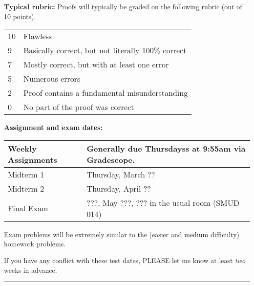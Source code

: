 \documentclass[12pt]{article}
\begin{document}
\vspace*{.15in}
\noindent\begin{minipage}{\textwidth}
\noindent\textbf{Typical rubric:}
Proofs will typically be graded on the following rubric (out of 10 points).

  \begin{center}
   \begin{tabular}{|l|l|}
   \hline
   10& Flawless\\
   9& Basically correct, but not literally 100\% correct\\
   7& Mostly correct, but with at least one error\\
   5& Numerous errors\\
   2& Proof contains a fundamental misunderstanding\\
   0& No part of the proof was correct\\
   \hline
   \end{tabular}
  \end{center}
\end{minipage}

\noindent\textbf{Assignment and exam dates:}

\begin{center}
 \begin{tabular}{|l|l|}
 \hline
 Weekly Assignments & Generally due Thursdayss at 9:55am via Gradescope.\\
 \hline
 Midterm 1 & Thursday, March ?? \\
 Midterm 2 & Thursday, April ?? \\ 
   Final Exam & ???, May ???, ??? in the usual room (SMUD 014)	 \\
 \hline
 \end{tabular}
\end{center}

\noindent Exam problems will be extremely similar to the (easier and medium difficulty) homework problems.
\smallskip

\noindent If you have any conflict with these test dates, PLEASE let me know at least \emph{two} weeks in advance.

\medskip \hrule \medskip
\end{document}
